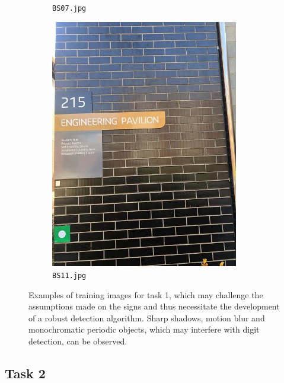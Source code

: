 \documentclass{article}
\begin{document}
\begin{figure}[h]
\begin{subfigure}[t]{0.22\textwidth}
    \caption[BS07]{
      \lstinline{BS07.jpg}
    }
    \label{fig:bs07}
  \end{subfigure}
  \begin{subfigure}[t]{0.22\textwidth}
    \centering
    \includegraphics[width=0.9\textwidth]{../train/task1/BS11}
    \caption[BS11]{
      \lstinline{BS11.jpg}
    }
    \label{fig:bs11}
  \end{subfigure}

  \caption[Task 1 - Edge Cases]{
    Examples of training images for task 1, which may challenge the assumptions
    made on the signs and thus necessitate the development of a robust detection
    algorithm.
    Sharp shadows, motion blur and monochromatic periodic objects, which may
    interfere with digit detection, can be observed.
  }
  \label{fig:problem-1-outlier}
\end{figure}

\subsection{Task 2}
\label{sec:problem-2}
\end{document}

